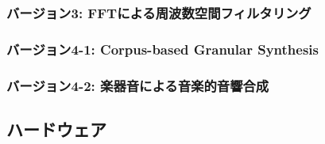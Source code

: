 
\subsubsection{バージョン3: FFTによる周波数空間フィルタリング}

\subsubsection{バージョン4-1: Corpus-based Granular Synthesis}

\subsubsection{バージョン4-2: 楽器音による音楽的音響合成}

\subsection{ハードウェア}

